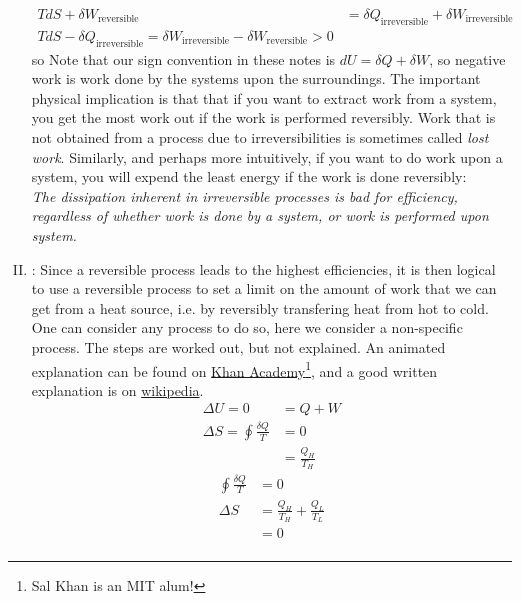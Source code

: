 \documentclass[12pt]{article}
\begin{document}
\begin{enumerate}[(I)]
\begin{align} T dS + \delta W_\text{reversible} &= \delta Q_\text{irreversible} + \delta W_\text{irreversible}\\
T dS -\delta Q_\text{irreversible}  = \delta W_\text{irreversible} - \delta W_\text{reversible} > 0
\end{align}
so
\beq {}
\ceq
Note that our sign convention in these notes is $dU = \delta Q + \delta W$, so negative work is work done by the systems upon the surroundings. The important physical implication is that that if you want to extract work from a system, you get the most work out if the work is performed reversibly. Work that is not obtained from a process due to irreversibilities is sometimes called \emph{lost work}. Similarly, and perhaps more intuitively, if you want to do work upon a system, you will expend the least energy if the work is done reversibly: \\ \emph{The dissipation inherent in irreversible processes is bad for efficiency, regardless of whether work is done by a system, or work is performed upon system.} %
\item {}: 
Since a reversible process leads to the highest efficiencies, it is then logical to use a reversible process to set a limit on the amount of work that we can get from a heat source, i.e. by reversibly transfering heat from hot to cold. One can consider any process to do so, here we consider a non-specific process. The steps are worked out, but not explained. An animated explanation can be found on \href{https://www.khanacademy.org/science/physics/thermodynamics/v/efficiency-of-a-carnot-engine}{Khan Academy}\footnote{Sal Khan is an MIT alum!}, and a good written explanation is on \href{https://en.wikipedia.org/wiki/Carnot_cycle}{wikipedia}.
\begin{align*}
\Delta U = 0 &= Q + W\\
\Delta S = \oint \frac{\delta Q}{T}& = 0\\
&= \frac{Q_H}{T_H}
\end{align*}
\begin{align*}
\oint \frac{\delta Q}{T} &= 0\\
\Delta S &= \frac{Q_H}{T_H} + \frac{Q_L}{T_L}\\
&= 0\\

\end{align*}
\end{enumerate}
\end{document}
